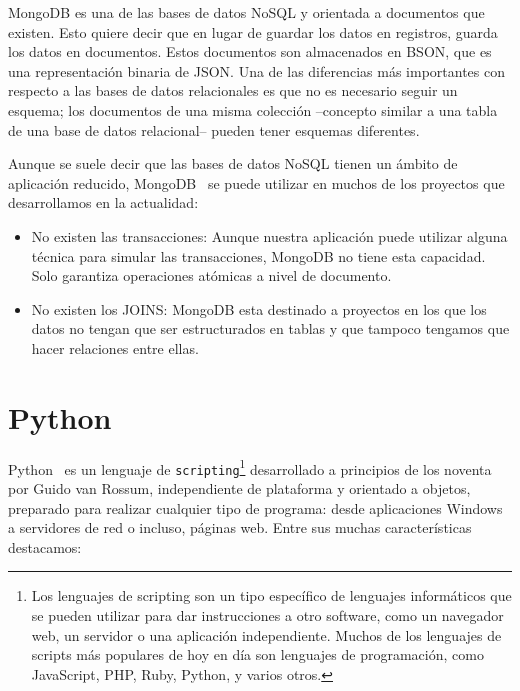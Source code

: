 \documentclass[a4paper, 12pt]{book}
\begin{document}
MongoDB es una de las bases de datos NoSQL y orientada a documentos que existen. Esto quiere decir que en lugar de guardar los datos en registros, guarda los datos en documentos. Estos documentos son almacenados en BSON, que es una representación binaria de JSON. Una de las diferencias más importantes con respecto a las bases de datos relacionales es que no es necesario seguir un esquema; los documentos de una misma colección --concepto similar a una tabla de una base de datos relacional-- pueden tener esquemas diferentes.

	Aunque se suele decir que las bases de datos NoSQL tienen un ámbito de aplicación reducido, MongoDB~\cite{mongodb} se puede utilizar en muchos de los proyectos que desarrollamos en la actualidad:
\begin{itemize}
	\item No existen las transacciones: Aunque nuestra aplicación puede utilizar alguna técnica para simular las transacciones, MongoDB no tiene esta capacidad. Solo garantiza operaciones atómicas a nivel de documento.
	\item No existen los JOINS: MongoDB esta destinado a proyectos en los que los datos no tengan que  ser estructurados en tablas y que tampoco tengamos que hacer relaciones entre ellas.
\end{itemize}

\section{Python} 
\label{sec:Python}
Python~\cite{Python}  es un lenguaje de \texttt{scripting}\footnote{Los lenguajes de scripting son un tipo específico de lenguajes informáticos que se pueden utilizar para dar instrucciones a otro software, como un navegador web, un servidor o una aplicación independiente. Muchos de los lenguajes de scripts más populares de hoy en día son lenguajes de programación, como JavaScript, PHP, Ruby, Python, y varios otros.} desarrollado a principios de los noventa por Guido van Rossum, independiente de plataforma y orientado a objetos, preparado para realizar cualquier tipo de programa: desde aplicaciones Windows a servidores de red o incluso, páginas web. Entre sus muchas características destacamos:
\end{document}
